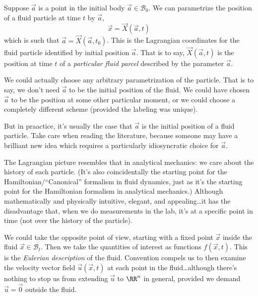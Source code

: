 \begin{node}\label{fluids:describing-0002}%
Suppose $\vec{a}$ is a point in the initial body $\vec{a}\in\mathcal{B}_{0}$.
We can parametrize the position of a fluid particle at time $t$ by $\vec{a}$,
\begin{equation*}
\vec{x}=\vec{X}(\vec{a},t)
\end{equation*}
which is such that $\vec{a}=\vec{X}(\vec{a},t_{0})$. This is the
Lagrangian coordinates for the fluid particle identified by initial
position $\vec{a}$. That is to say, $\vec{X}(\vec{a},t)$ is the position
at time $t$ of a \emph{particular fluid parcel} described by the
parameter $\vec{a}$.

\begin{node}\label{fluids:describing-0003}%
We could actually choose any arbitrary parametrization of the
particle. That is to say, we don't need $\vec{a}$ to be the initial
position of the fluid. We could have chosen $\vec{a}$ to be the position
at some other particular moment, or we could choose a completely
different scheme (provided the labeling was unique).

But in praactice, it's usually the case that $\vec{a}$ is the initial
position of a fluid particle. Take care when reading the literature,
because someone may have a brilliant new idea which requires a
particularly idiosyncratic choice for $\vec{a}$.
\end{node}

\begin{node}\label{fluids:describing-0004}%
The Lagrangian picture resembles that in analytical mechanics: we care
about the history of each particle. (It's also coincidentally the
starting point for the Hamiltonian/``Canonical'' formalism in fluid
dynamics, just as it's the starting point for the Hamiltonian formalism
in analytical mechanics.) Although mathematically and physically
intuitive, elegant, and appealing\dots it has the disadvantage that, when
we do measurements in the lab, it's at a specific point in time (not
over the history of the particle). 
\end{node}
\end{node}

\begin{node}\label{fluids:describing-0005}%
We could take the opposite point of view, starting with a fixed point
$\vec{x}$ inside the fluid $\vec{x}\in\mathcal{B}_{t}$. Then we take the
quantities of interest as functions $f(\vec{x},t)$. This is the
\emph{Eulerian description} of the fluid. Convention compels us to then
examine the velocity vector field $\vec{u}(\vec{x},t)$ at each point in
the fluid\dots although there's nothing to stop us from extending
$\vec{u}$ to $\RR^{n}$ in general, provided we demand $\vec{u}=\vec{0}$
outside the fluid.
\end{node}

